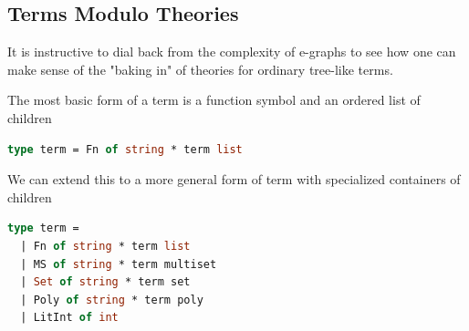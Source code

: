 \documentclass[sigconf]{acmart}
\begin{document}










\subsection{Terms Modulo Theories}

It is instructive to dial back from the complexity of e-graphs to see how one can make sense of the "baking in" of theories for ordinary tree-like terms.

The most basic form of a term is a function symbol and an ordered list of children
\begin{lstlisting}[language=Caml]
type term = Fn of string * term list
\end{lstlisting}

We can extend this to a more general form of term with specialized containers of children

\begin{lstlisting}[language=Caml]
type term = 
  | Fn of string * term list
  | MS of string * term multiset
  | Set of string * term set
  | Poly of string * term poly
  | LitInt of int
\end{lstlisting}
\end{document}
